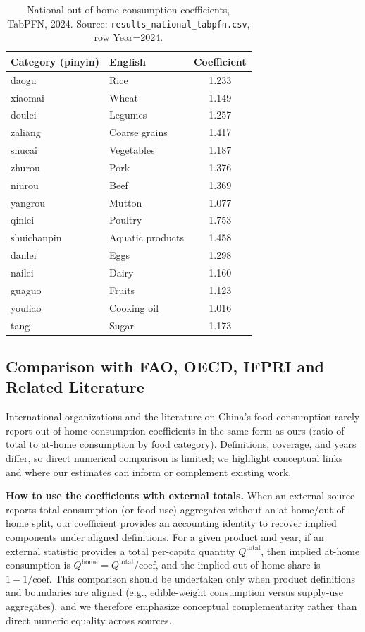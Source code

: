 \begin{table}[htbp]
\centering
\caption{National out-of-home consumption coefficients, TabPFN, 2024. Source: \texttt{results\_national\_tabpfn.csv}, row Year=2024.}
\label{tab:tabpfn_2024_national}
\begin{tabular}{llc}
\toprule
Category (pinyin) & English & Coefficient \\
\midrule
daogu & Rice & 1.233 \\
xiaomai & Wheat & 1.149 \\
doulei & Legumes & 1.257 \\
zaliang & Coarse grains & 1.417 \\
shucai & Vegetables & 1.187 \\
zhurou & Pork & 1.376 \\
niurou & Beef & 1.369 \\
yangrou & Mutton & 1.077 \\
qinlei & Poultry & 1.753 \\
shuichanpin & Aquatic products & 1.458 \\
danlei & Eggs & 1.298 \\
nailei & Dairy & 1.160 \\
guaguo & Fruits & 1.123 \\
youliao & Cooking oil & 1.016 \\
tang & Sugar & 1.173 \\
\bottomrule
\end{tabular}
\end{table}

\subsection{Comparison with FAO, OECD, IFPRI and Related Literature}

International organizations and the literature on China's food consumption rarely report out-of-home consumption coefficients in the same form as ours (ratio of total to at-home consumption by food category). Definitions, coverage, and years differ, so direct numerical comparison is limited; we highlight conceptual links and where our estimates can inform or complement existing work.

\textbf{How to use the coefficients with external totals.} When an external source reports total consumption (or food-use) aggregates without an at-home/out-of-home split, our coefficient provides an accounting identity to recover implied components under aligned definitions. For a given product and year, if an external statistic provides a total per-capita quantity \(Q^{\text{total}}\), then implied at-home consumption is \(Q^{\text{home}} = Q^{\text{total}}/\text{coef}\), and the implied out-of-home share is \(1 - 1/\text{coef}\). This comparison should be undertaken only when product definitions and boundaries are aligned (e.g., edible-weight consumption versus supply-use aggregates), and we therefore emphasize conceptual complementarity rather than direct numeric equality across sources.

